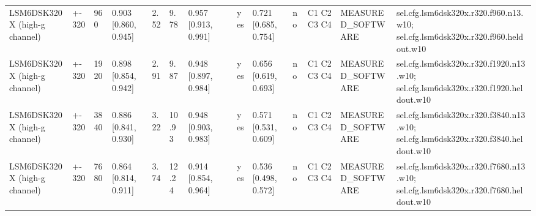 \begin{table}[t]
\begin{tabular}{llllllllllllll}
LSM6DSK320X (high-g channel) & +-320 & 960 & 0.903 [0.860, 0.945] & 2.52 & 9.78 & 0.957 [0.913, 0.991] &  & yes & 0.721 [0.685, 0.754] & no & C1 C2 C3 C4 & MEASURED\_SOFTWARE & sel.cfg.lsm6dsk320x.r320.f960.n13.w10; sel.cfg.lsm6dsk320x.r320.f960.heldout.w10 \\
LSM6DSK320X (high-g channel) & +-320 & 1920 & 0.898 [0.854, 0.942] & 2.91 & 9.87 & 0.948 [0.897, 0.984] &  & yes & 0.656 [0.619, 0.693] & no & C1 C2 C3 C4 & MEASURED\_SOFTWARE & sel.cfg.lsm6dsk320x.r320.f1920.n13.w10; sel.cfg.lsm6dsk320x.r320.f1920.heldout.w10 \\
LSM6DSK320X (high-g channel) & +-320 & 3840 & 0.886 [0.841, 0.930] & 3.22 & 10.93 & 0.948 [0.903, 0.983] &  & yes & 0.571 [0.531, 0.609] & no & C1 C2 C3 C4 & MEASURED\_SOFTWARE & sel.cfg.lsm6dsk320x.r320.f3840.n13.w10; sel.cfg.lsm6dsk320x.r320.f3840.heldout.w10 \\
LSM6DSK320X (high-g channel) & +-320 & 7680 & 0.864 [0.814, 0.911] & 3.74 & 12.24 & 0.914 [0.854, 0.964] &  & yes & 0.536 [0.498, 0.572] & no & C1 C2 C3 C4 & MEASURED\_SOFTWARE & sel.cfg.lsm6dsk320x.r320.f7680.n13.w10; sel.cfg.lsm6dsk320x.r320.f7680.heldout.w10 \\
\bottomrule
\end{tabular}
\end{table}
